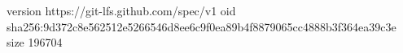 version https://git-lfs.github.com/spec/v1
oid sha256:9d372c8e562512e5266546d8ee6c9f0ea89b4f8879065cc4888b3f364ea39c3e
size 196704
